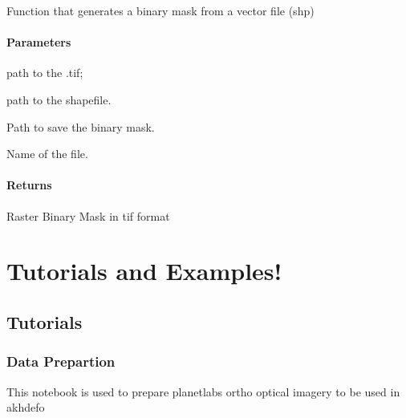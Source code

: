 \documentclass[letterpaper,10pt]{sphinxmanual}
\begin{document}
\begin{fulllineitems}
\label{\detokenize{generated/akhdefo_functions.binary_mask:akhdefo_functions.binary_mask}}
\pysigstartsignatures
{}
\pysigstopsignatures
\sphinxAtStartPar
Function that generates a binary mask from a vector file (shp)


\subsubsection{Parameters}
\label{\detokenize{generated/akhdefo_functions.binary_mask:parameters}}\begin{description}
\sphinxAtStartPar
path to the .tif;

\sphinxAtStartPar
path to the shapefile.

\sphinxAtStartPar
Path to save the binary mask.

\sphinxAtStartPar
Name of the file.

\end{description}


\subsubsection{Returns}
\label{\detokenize{generated/akhdefo_functions.binary_mask:returns}}
\sphinxAtStartPar
Raster Binary Mask in tif format

\end{fulllineitems}



\chapter{Tutorials and Examples!}
\label{\detokenize{index:tutorials-and-examples}}
\sphinxstepscope


\section{Tutorials}
\label{\detokenize{Tutorials:tutorials}}\label{\detokenize{Tutorials::doc}}
\sphinxstepscope


\subsection{Data Prepartion}
\label{\detokenize{notebooks/Data_Prep:Data-Prepartion}}\label{\detokenize{notebooks/Data_Prep::doc}}
\sphinxAtStartPar
This notebook is used to prepare planetlabs ortho optical imagery to be used in akhdefo
\end{document}
